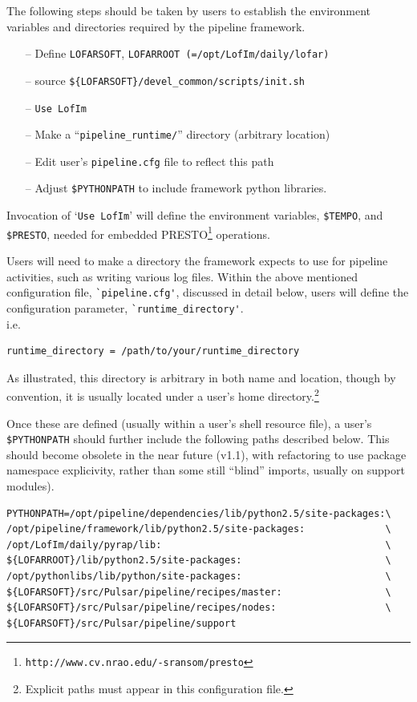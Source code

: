 \documentclass[a4paper,10pt,bibtotoc]{scrartcl}
\begin{document}
The following steps should be taken by users to establish the
environment  variables and directories required by the pipeline framework.
\begin{itemize}
\item[--] Define \verb|LOFARSOFT|, \verb|LOFARROOT (=/opt/LofIm/daily/lofar)|
\item [--]source \verb|${LOFARSOFT}/devel_common/scripts/init.sh|
\item [--]\verb|Use LofIm|
\item[--] Make a ``\verb|pipeline_runtime/|'' directory (arbitrary location)
\item[--] Edit user's \verb|pipeline.cfg| file to reflect this path
\item[--] Adjust \verb|$PYTHONPATH| to include framework python
  libraries.
\end{itemize}
Invocation of `\verb|Use LofIm|' will define the environment variables, \verb|$TEMPO|,
and \verb|$PRESTO|, needed for embedded
PRESTO\footnote{\texttt{http://www.cv.nrao.edu/-sransom/presto}} operations.

Users will need to make a directory the framework expects to use for
pipeline activities, such as writing various log files. Within the
above mentioned  configuration file, \verb|`pipeline.cfg'|, discussed in detail below,
users will define the configuration parameter, \verb|`runtime_directory'|.\\
i.e. 
\begin{verbatim}
runtime_directory = /path/to/your/runtime_directory
\end{verbatim}

As illustrated, this directory is arbitrary in both name and location,
though by convention, it is usually located under a user's home
directory.\footnote{Explicit paths must appear in this configuration file.}

Once these are defined (usually within a user's shell resource file),
a user's \verb|$PYTHONPATH| should further include the following paths
described below.  This should become obsolete in the near future
(v1.1), with refactoring to use package namespace explicivity, rather
than some still ``blind'' imports, usually on support modules).

\begin{verbatim}
PYTHONPATH=/opt/pipeline/dependencies/lib/python2.5/site-packages:\
/opt/pipeline/framework/lib/python2.5/site-packages:              \ 
/opt/LofIm/daily/pyrap/lib:                                       \
${LOFARROOT}/lib/python2.5/site-packages:                         \
/opt/pythonlibs/lib/python/site-packages:                         \
${LOFARSOFT}/src/Pulsar/pipeline/recipes/master:                  \
${LOFARSOFT}/src/Pulsar/pipeline/recipes/nodes:                   \
${LOFARSOFT}/src/Pulsar/pipeline/support 
\end{verbatim}
\end{document}
